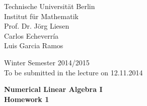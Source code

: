 \documentclass[14pt]{report}
\begin{document}
\begin{minipage}[t]{0.58\textwidth}
Technische Universit\"at Berlin\\
Institut f\"ur Mathematik\\
Prof. Dr. J\"org Liesen\\
Carlos Echeverr\'ia\\
Luis Garcia Ramos
\end{minipage}
\hfill
\begin{minipage}[t]{0.48\textwidth}
\begin{flushright}
Winter Semester 2014/2015\\
To be submitted in the lecture on 12.11.2014\
\end{flushright}
\end{minipage}
\begin{center}
\textbf{{Numerical Linear Algebra I}}\\
\textbf{Homework 1}
\end{center}

\thispagestyle{empty}
\end{document}

